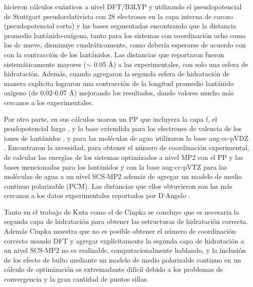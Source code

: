 \cite{Kuta2010} hicieron c\'alculos cu\'anticos a nivel DFT/B3LYP y
utilizando el pseudopotencial de Stuttgart pseudorelativista con 28 
electrones en la capa interna de carozo (pseudopotencial corto) 
\citep{Cao2001} y las bases segmentadas %
\citep{Cao2002} encontrando que la distancia promedio 
lant\'anido-ox\'igeno, tanto para los sistemas con coordinaci\'on 
ocho como los de nueve, disminuye cuadr\'aticamente, como deber\'ia 
esperarse de acuerdo con con la contracci\'on de los lant\'anidos. 
Las distancias que reportaron fueron sistem\'aticamente mayores 
($\sim$ 0.05 \AA) a las experimentales, con solo una esfera de 
hidrataci\'on. Adem\'as, cuando agregaron la segunda esfera de 
hidrataci\'on de manera expl\'icita lograron una contracci\'on de la 
longitud promedio lant\'anido ox\'igeno (de 0.02-0.07 \AA) mejorando 
los resultados, dando valores mucho m\'as cercanos a los 
experimentales.

Por otro parte, \cite{Ciup2010} en sus c\'alculos usaron un PP 
que incluyera la capa f, el psudopotencial largo \citep{Dolg1989}, y 
la base extendida para los electrones de valencia de los iones de 
lant\'anidos \citep{Yang2005}, %
y para las mol\'eculas de agua utilizaron la base aug-cc-pVDZ 
\citep{Dunn1989}. Encontraron la necesidad, para obtener el n\'umero 
de coordinaci\'on experimental, de calcular las energ\'ias de los 
sistemas optimizados a nivel MP2 con el PP y las bases mencionadas 
para los lant\'anidos y con la base aug-cc-pVTZ para las mol\'eculas 
de agua a un nivel SCS-MP2 \citep{Grim2003} adem\'as de agregar un 
modelo de medio continuo polarizable (PCM). Las distancias que ellos 
obtuvieron son las m\'as cercanas a los datos experimentales 
reportados por D`Angelo \citep{Dang2012}.

Tanto en el trabajo de Kuta como el de Ciupka se concluye que es 
necesaria la segunda capa de hidrataci\'on para obtener las 
estructuras de hidrataci\'on correcta. Adem\'as Ciupka muestra que no
es posible obtener el n\'umero de coordinaci\'on correcto usando DFT
y agregar expl\'icitamente la segunda capa de hidrataci\'on a un 
nivel SCS-MP2 no es realizable, computacionalmente hablando, 
y la inclusi\'on de los efecto de bulto mediante un modelo de medio
polarizable continuo en un c\'alculo de optimizaci\'on es 
extremadante dif\'icil debido a los problemas de convergencia y la 
gran cantidad de puntos sillas.


